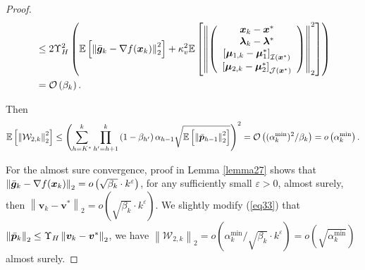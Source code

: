 \documentclass[aos]{imsart}
\numberwithin{equation}{section}
\theoremstyle{plain}
\begin{document}
\begin{appendix}
\begin{proof}
\begin{equation}
\begin{split}
            & \leq 2 \Upsilon_{H}^{2}  \left( \mathbb{E} \left[\left\| \Bar{\bm{g}}_k - \nabla f(\bm{x}_{k}) \right\|_2^2 \right] + \kappa_{v}^2 \mathbb{E} \left[ \left\|  \left( \begin{array}{c}
    \bm{x}_{k} - \bm{x}^{*}  \\
    \bm{\lambda}_{k} - \bm{\lambda}^{*} \\
    \left[ \bm{\mu}_{1,k} - \bm{\mu}_{1}^{*}\right]_{\mathcal{I}(\bm{x}^{*})} \\
    \left[ \bm{\mu}_{2,k} - \bm{\mu}_{2}^{*} \right]_{\mathcal{J}(\bm{x}^{*})} 
    \end{array} \right)  \right\|_2^2 \right]\right) \\
    & = \mathcal{O} \left( \beta_k \right).
        \end{split}
    \end{equation}

    Then 
    \begin{equation*}
        \begin{split}
            \mathbb{E} \left[ \left\|\mathcal{W}_{2,k} \right\|_2^2 \right] \leq \left( \sum_{h=K^{*}}^{k} \prod_{h^{\prime}=h+1}^{k} \left( 1- \beta_{h^{\prime}} \right) \alpha_{h-1} \sqrt{\mathbb{E} \left[\left\| \Bar{\bm{p}}_{h-1} \right\|_2^2 \right]} \right)^2 = \mathcal{O} \left(  (\alpha^{\min}_k)^2 / \beta_k \right) = o\left( \alpha^{\min}_k \right).
        \end{split}
    \end{equation*}

    For the almost sure convergence, proof in Lemma \ref{lemma27} shows that $\left\| \Bar{\bm{g}}_k - \nabla f(\bm{x}_{k}) \right\|_2 = o\left(\sqrt{\beta_k} \cdot k^{\varepsilon}  \right)$, for any sufficiently small $\varepsilon > 0$, almost surely, then $\left\| \bm{v}_{k} - \bm{v}^{*} \right\|_2 = o\left(\sqrt{\beta_k} \cdot k^{\varepsilon}  \right)$. We slightly modify (\ref{eq33}) that $\left\| \Bar{\bm{p}}_{k}\right\|_2 \leq \Upsilon_{H} \left\| \bm{v}_{k} - \bm{v}^{*} \right\|_2 $, we have $\left\|\mathcal{W}_{2,k} \right\|_2 = o\left( \alpha^{\min}_k / \sqrt{\beta_k} \cdot k^{\varepsilon}  \right) = o\left(\sqrt{\alpha^{\min}_k} \right)$ almost surely. 
\end{proof}




\end{appendix}
\end{document}
